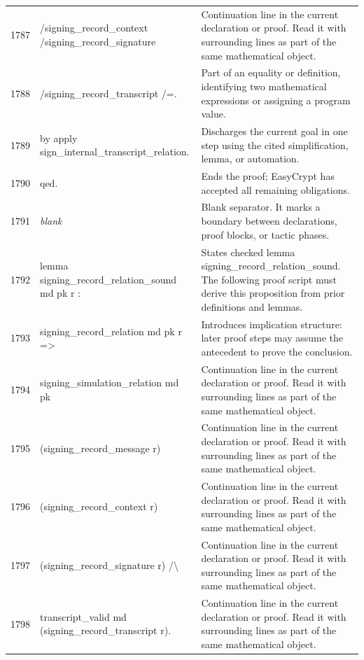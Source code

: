 \documentclass[10pt]{article}
\begin{document}
\begin{longtable}{r L{0.53\textwidth} L{0.37\textwidth}}
1787 & {\ttfamily\scriptsize         /signing\_record\_context /signing\_record\_signature} & Continuation line in the current declaration or proof.  Read it with surrounding lines as part of the same mathematical object. \\
1788 & {\ttfamily\scriptsize         /signing\_record\_transcript /=.} & Part of an equality or definition, identifying two mathematical expressions or assigning a program value. \\
1789 & {\ttfamily\scriptsize by apply sign\_internal\_transcript\_relation.} & Discharges the current goal in one step using the cited simplification, lemma, or automation. \\
1790 & {\ttfamily\scriptsize qed.} & Ends the proof; EasyCrypt has accepted all remaining obligations. \\
1791 & {\ttfamily\scriptsize \emph{blank}} & Blank separator.  It marks a boundary between declarations, proof blocks, or tactic phases. \\
1792 & {\ttfamily\scriptsize lemma signing\_record\_relation\_sound md pk r :} & States checked lemma signing\_record\_relation\_sound.  The following proof script must derive this proposition from prior definitions and lemmas. \\
1793 & {\ttfamily\scriptsize   signing\_record\_relation md pk r =>} & Introduces implication structure: later proof steps may assume the antecedent to prove the conclusion. \\
1794 & {\ttfamily\scriptsize   signing\_simulation\_relation md pk} & Continuation line in the current declaration or proof.  Read it with surrounding lines as part of the same mathematical object. \\
1795 & {\ttfamily\scriptsize     (signing\_record\_message r)} & Continuation line in the current declaration or proof.  Read it with surrounding lines as part of the same mathematical object. \\
1796 & {\ttfamily\scriptsize     (signing\_record\_context r)} & Continuation line in the current declaration or proof.  Read it with surrounding lines as part of the same mathematical object. \\
1797 & {\ttfamily\scriptsize     (signing\_record\_signature r) /\textbackslash{}} & Continuation line in the current declaration or proof.  Read it with surrounding lines as part of the same mathematical object. \\
1798 & {\ttfamily\scriptsize   transcript\_valid md (signing\_record\_transcript r).} & Continuation line in the current declaration or proof.  Read it with surrounding lines as part of the same mathematical object. \\

\end{longtable}
\end{document}
